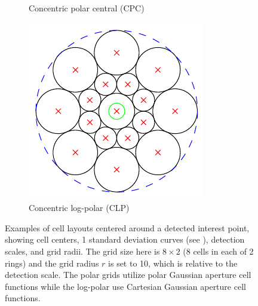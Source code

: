 \documentclass[thesis.tex]{subfiles}
\begin{document}
\begin{figure}[p]
\begin{subfigure}[t]{0.32\textwidth}
		\caption{Concentric polar central (CPC)}
		\label{fig:gridTypeCpc}
	\end{subfigure}
	\begin{subfigure}[t]{0.32\textwidth}
		\includegraphics[width=\textwidth]{img/gridType_concentric_log-polar.pdf}
		\caption{Concentric log-polar (CLP)}
		\label{fig:gridTypeClp}
	\end{subfigure}
	\caption{Examples of cell layouts centered around a detected interest point, showing cell centers, 1 standard deviation curves (see ), detection scales, and grid radii. The grid size here is $8 \times 2$ (8 cells in each of 2 rings) and the grid radius $r$ is set to 10, which is relative to the detection scale. The polar grids utilize polar Gaussian aperture cell functions while the log-polar use Cartesian Gaussian aperture cell functions.}
	\label{fig:gridType}
\end{figure}
%
\end{document}
